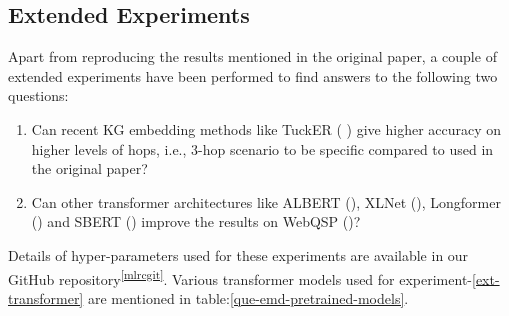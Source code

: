 \subsection{Extended Experiments}
Apart from reproducing the results mentioned in the original paper, a couple of extended experiments have been performed to find answers to the following two questions:
\begin{enumerate}
        \item \label{ext-tucker} Can recent KG embedding methods like TuckER ( \citep{tucker2019}) give higher accuracy on higher levels of hops, i.e., 3-hop scenario to be specific compared to \citep{ComplEx2016} used in the original paper? 
    \item \label{ext-transformer} Can other transformer architectures like ALBERT (\citep{albert}), XLNet (\citep{xlnet}), Longformer (\citep{beltagy2020longformer}) and SBERT (\citep{reimers-2019-sentence-bert}) improve the results on WebQSP (\citep{webqsp-dataset})?
\end{enumerate}

Details of hyper-parameters used for these experiments are available in our GitHub repository\textsuperscript{\ref{mlrcgit}}. Various transformer models used for experiment-\ref{ext-transformer} are mentioned in table:\ref{que-emd-pretrained-models}.


